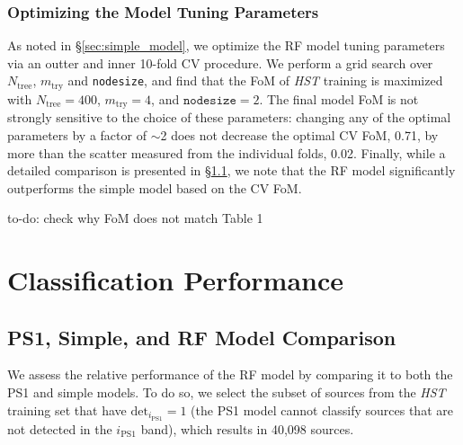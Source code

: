 \documentclass[twocolumn, dvipdfmx]{aastex62}
\newcommand{\todo}[1]{{\color{magenta} to-do: {#1}}}
\begin{document}
\subsubsection{Optimizing the Model Tuning Parameters}

As noted in \S\ref{sec:simple_model}, we optimize the RF model tuning parameters via an outter and inner 10-fold CV procedure. We perform a grid search over $N_{\mathrm{tree}}$, $m_{\mathrm{try}}$ and \texttt{nodesize}, and find that the FoM of \textit{HST} training is maximized with $N_{\mathrm{tree}} = 400$, $m_{\mathrm{try}} = 4$, and $\mathtt{nodesize} = 2$. The final model FoM is not strongly sensitive to the choice of these parameters: changing any of the optimal parameters by a factor of $\sim$2 does not decrease the optimal CV FoM, 0.71, by more than the scatter measured from the individual folds, 0.02. Finally, while a detailed comparison is presented in \S\ref{sec:comp_hst}, we note that the RF model significantly outperforms the simple model based on the CV FoM.

\todo{check why FoM does not match Table 1}

\section{Classification Performance}

\subsection{PS1, Simple, and RF Model Comparison}\label{sec:comp_hst}

We assess the relative performance of the RF model by comparing it to both
the PS1 and simple models. To do so, we select the subset of sources from
the \textit{HST} training set that have $\mathrm{det}_{i_\mathrm{PS1}} = 1$
(the PS1 model cannot classify sources that are not detected in the
$i_\mathrm{PS1}$ band), which results in 40,098 sources.
\end{document}
